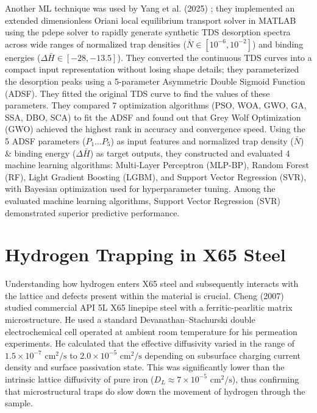 \documentclass[a4paper,12pt,oneside]{report}
\begin{document}
Another ML technique was used by Yang et al. (2025) \cite{Yang2025}; they implemented an extended dimensionless Oriani local equilibrium transport solver in MATLAB using the pdepe solver to rapidly generate synthetic TDS desorption spectra across wide ranges of normalized trap densities ($\bar{N} \in [10^{-6}, 10^{-2}]$) and binding energies ($\Delta \bar{H} \in [-28, -13.5]$). They converted the continuous TDS curves into a compact input representation without losing shape details; they parameterized the desorption peaks using a 5-parameter Asymmetric Double Sigmoid Function (ADSF). They fitted the original TDS curve to find the values of these parameters. They compared 7 optimization algorithms (PSO, WOA, GWO, GA, SSA, DBO, SCA) to fit the ADSF and found out that Grey Wolf Optimization (GWO) achieved the highest rank in accuracy and convergence speed. Using the 5 ADSF parameters ($P_1 \dots P_5$) as input features and normalized trap density ($\bar{N}$) \& binding energy ($\Delta \bar{H}$) as target outputs, they constructed and evaluated 4 machine learning algorithms: Multi-Layer Perceptron (MLP-BP), Random Forest (RF), Light Gradient Boosting (LGBM), and Support Vector Regression (SVR), with Bayesian optimization used for hyperparameter tuning. Among the evaluated machine learning algorithms, Support Vector Regression (SVR) demonstrated superior predictive performance.
\section{Hydrogen Trapping in X65 Steel}
\label{sec:hydrogen_trapping_x65}

Understanding how hydrogen enters X65 steel and subsequently interacts with the lattice and defects present within the material is crucial. Cheng (2007) studied commercial API 5L X65 linepipe steel with a ferritic-pearlitic matrix microstructure. He used a standard Devanathan–Stachurski double electrochemical cell operated at ambient room temperature for his permeation experiments. He calculated that the effective diffusivity varied in the range of $1.5 \times 10^{-7}\text{ cm}^2/\text{s}$ to $2.0 \times 10^{-5}\text{ cm}^2/\text{s}$ depending on subsurface charging current density and surface passivation state. This was significantly lower than the intrinsic lattice diffusivity of pure iron ($D_L \approx 7 \times 10^{-5}\text{ cm}^2/\text{s}$), thus confirming that microstructural traps do slow down the movement of hydrogen through the sample.
\end{document}
